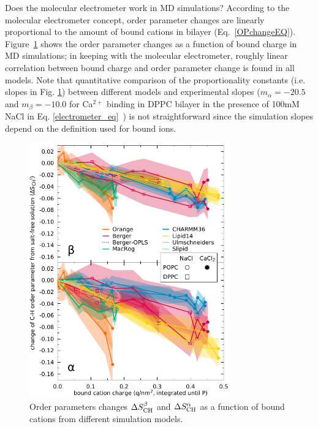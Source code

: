 \documentclass[pre,aps,floatfix,authordate1-4,twocolumn]{revtex4-1}
\begin{document}
Does the molecular electrometer work in MD simulations?
According to the molecular electrometer concept, order parameter changes are linearly proportional to
the amount of bound cations in bilayer (Eq.~\eqref{OPchangeEQ}).
Figure~\ref{electrometer} shows the order parameter changes as a function of bound charge in MD simulations;
in keeping with the molecular electrometer, roughly linear correlation between bound charge and order parameter change is found in all models.
Note that quantitative comparison of the proportionality constants (i.e. slopes in Fig. \ref{electrometer})
between different models and experimental slopes
($m_\alpha=-20.5$ and $m_\beta=-10.0$ for Ca$^{2+}$ binding in DPPC bilayer in
the presence of 100mM NaCl in Eq. \ref{electrometer_eq}~\cite{altenbach84}) is not straightforward 
since the simulation slopes depend on the definition used for bound ions. 
\begin{figure}[]
  \centering
  \includegraphics[width=8.6cm]{../scratch/boundIons/dOP_vs_boundCationCharge_P.pdf}
  \caption{\label{electrometer}
    Order parameters changes $\Delta S_{\rm{CH}}^{\beta}$ and $\Delta S_{\rm{CH}}^{\alpha}$ as a function of bound
    cations from different simulation models.
   }
\end{figure}
\end{document}
